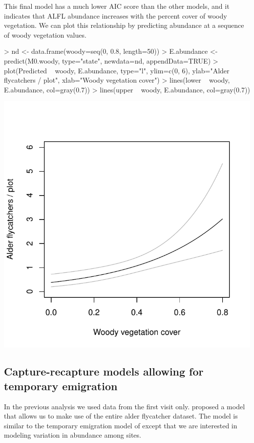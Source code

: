 \documentclass[a4paper]{article}
\renewenvironment{Schunk}{\vspace{\topsep}}{\vspace{\topsep}}
\begin{document}
This final model has a much lower AIC score than the other models, and
it indicates
that ALFL abundance increases with the percent cover
of woody vegetation. We can plot this relationship by predicting
abundance at a sequence of woody vegetation values.

\begin{Schunk}
\begin{Sinput}
> nd <- data.frame(woody=seq(0, 0.8, length=50))
> E.abundance <- predict(M0.woody, type="state", newdata=nd, appendData=TRUE)
> plot(Predicted ~ woody, E.abundance, type="l", ylim=c(0, 6),
      ylab="Alder flycatchers / plot", xlab="Woody vegetation cover")
> lines(lower ~ woody, E.abundance, col=gray(0.7))
> lines(upper ~ woody, E.abundance, col=gray(0.7))
\end{Sinput}
\end{Schunk}
\includegraphics{cap-recap-012}


\subsection*{Capture-recapture models allowing for temporary emigration}

In the previous analysis we used data from the first visit only.
\citet{chandlerEA_2011} proposed a model that allows us to
make use of the entire alder flycatcher dataset. The model is similar
to the temporary emigration model of \citet{kendall_etal:1997} except
that we are
interested in modeling variation in abundance among sites.
\end{document}
